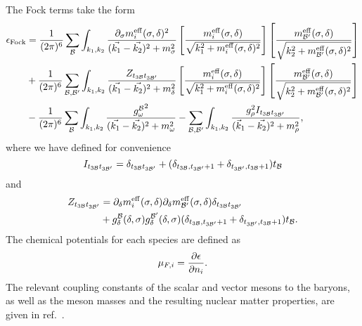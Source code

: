 The Fock terms take the form
%
\begin{equation}
	\begin{split}
		\epsilon_\text{Fock}  & = 
		\frac{1}{(2\pi)^6} \sum_{\cal B} \int_{k_1,k_2} 
		\frac{\partial_\sigma m_i^{\rm eff}(\sigma,\delta)^2}{(\vec{k_1}-\vec{k_2})^2+m_\sigma^2}
		\left[\frac{m_i^{\rm eff}(\sigma,\delta)}{\sqrt{k_1^2+m_i^{\rm eff}(\sigma,\delta)^2}}\right] 
		\left[\frac{m^{\rm eff}_{\cal B'}(\sigma,\delta)}
		{\sqrt{k_2^2+m^{\rm eff}_{\cal B'}(\sigma,\delta)^2}}\right] \\
		&+\frac{1}{(2\pi)^6} \sum_{\cal B,B'} \int_{k_1,k_2}  
		\frac{Z_{t_{3\cal B} t_{3\cal B'}}}{(\vec{k_1}-\vec{k_2})^2+m_\delta^2}
		\left[\frac{m_i^{\rm eff}(\sigma,\delta)}{\sqrt{k_1^2+m_i^{\rm eff}(\sigma,\delta)^2}}\right] 
		\left[\frac{m^{\rm eff}_{\cal B'}(\sigma,\delta)}{\sqrt{k_2^2+m^{\rm eff}_{\cal B'}(\sigma,\delta)^2}}\right]\\
		&-\frac{1}{(2\pi)^6} \sum_{\cal B} \int_{k_1,k_2}  
		\frac{{g^{\cal B}_\omega}^2}{(\vec{k_1} - \vec{k_2})^2 + m_\omega^2} 
		- \sum_{\cal B,B'} \int_{k_1,k_2}  \frac{g_\rho^2 I_{t_{3\cal B} t_{3\cal B'}}}{(\vec k_1 - \vec{k_2})^2 + m_\rho^2}  , 
	\end{split}
\end{equation}
%
where we have defined for convenience
%
	\begin{equation}
	I_{t_{3\cal B} t_{3\cal B'}}
	=  \delta_{t_{3\cal B} t_{3\cal B'}} + {(\delta_{t_{3\cal B}, t_{3\cal B'}+1}+\delta_{t_{3\cal B'}, t_{3\cal B}+1})}{t_{\cal B}} 
	\end{equation}
%
and
%
\begin{equation}
	\begin{split}
		Z_{t_{3\cal B} t_{3\cal B'}}
		&= \partial_\delta m_i^{\rm eff}(\sigma,\delta)\partial_\delta 
		m^{\rm eff}_{\cal B'}(\sigma,\delta)  \delta_{t_{3\cal B} t_{3\cal B'}} \\
		&+ g^{\cal B}_\delta(\delta,\sigma)g^{\cal B'}_\delta(\delta,\sigma)  {(\delta_{t_{3\cal B}, t_{3\cal B'}+1}+\delta_{t_{3\cal B'}, t_{3\cal B}+1})}{t_{\cal B}}.
	\end{split}
\end{equation}
%
The chemical potentials for each species are defined as 
%
\begin{equation}
    \mu_{F,i} = \frac{\partial \epsilon}{\partial n_i} .
\end{equation}
The relevant coupling constants of the scalar and vector mesons to the baryons, as well as the meson masses and the resulting nuclear matter properties, are given in ref.~\cite{Motta:2019tjc_Isovectoreffectsneutron}.

